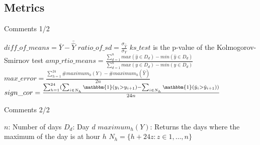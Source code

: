 \documentclass[xcolor=dvipsnames]{beamer}
\begin{document}
    \subsection{Metrics}
    \begin{frame}{}
    \end{frame}

    \begin{frame}{Comments 1/2}
        \begin{outline}
            \1 $diff\_of\_means = \bar{Y} - \bar{\hat{Y}}$
            \1 $ratio\_of\_sd = \frac{\sigma_{\hat{Y}}}{\sigma_{Y}}$    
            \1 $ks\_test$ is the p-value of the Kolmogorov-Smirnov test
            \1 $amp\_rtio\_means = \frac{\sum_{d=1}^{n} max({\hat{y} \in D_d}) - min({\hat{y} \in D_d})}{\sum_{d=1}^{n} max({y \in D_d}) - min({y \in D_d})}$
            \1 $max\_error = \frac{\sum_{h=1}^{24}\#maximum_h(Y) - \#maximum_h(\hat{Y})}{2n}$
            \1 $sign\_cor = \frac{\sum_{h=1}^{24}(\sum_{i \in N_h}\mathbbm{1}(y_i > y_{i+1}) - \sum_{i \in N_h}\mathbbm{1}(\hat{y}_i > \hat{y}_{i+1}))}{24n}$    
        \end{outline}
    \end{frame}

    \begin{frame}{Comments 2/2}
        \begin{outline}
            \1 $n$: Number of days
            \1 $D_d$: Day $d$
            \1 $maximum_h(Y)$: Returns the days where the maximum of the day is at hour $h$
            \1 $N_h = \{h + 24z: z \in {1, \ldots, n}\}$
        \end{outline}
    \end{frame}
\end{document}

